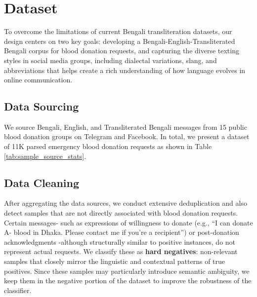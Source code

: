 \documentclass[11pt]{article}
\begin{document}
\section{Dataset}
To overcome the limitations of current Bengali transliteration datasets, our design centers on two key goals: developing a Bengali-English-Transliterated Bengali corpus for blood donation requests, and capturing the diverse texting styles in social media groups, including dialectal variations, slang, and abbreviations that helps create a rich understanding of how language evolves in online communication.

\subsection{Data Sourcing}
We source Bengali, English, and Transliterated Bengali messages from 15 public blood donation groups on Telegram and Facebook. In total, we present a dataset of 11K parsed emergency blood donation requests as shown in Table \ref{tab:sample_source_stats}.


\subsection{Data Cleaning}
After aggregating the data sources, we conduct extensive deduplication and also detect samples that are not directly associated with blood donation requests. Certain messages- such as expressions of willingness to donate (e.g., “I can donate A- blood in Dhaka. Please contact me if you're a recipient”) or post-donation acknowledgments -although structurally similar to positive instances, do not represent actual requests. We classify these as \textbf{hard negatives}: non-relevant samples that closely mirror the linguistic and contextual patterns of true positives. Since these samples may particularly introduce semantic ambiguity, we keep them in the negative portion of the dataset to improve the robustness of the classifier.
\end{document}
